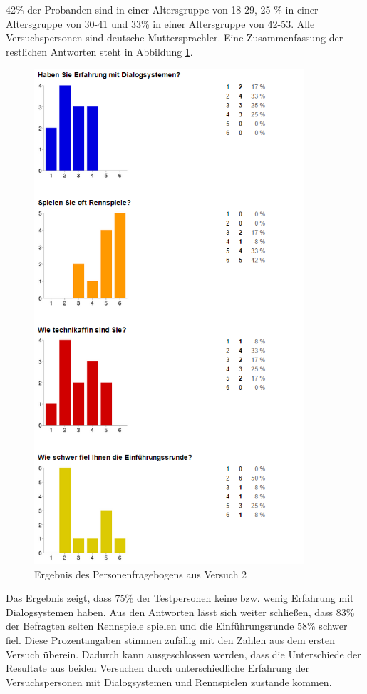\documentclass[12pt,a4paper]{scrartcl}
\begin{document}
42\% der Probanden sind in einer Altersgruppe von 18-29, 25 \% in einer Altersgruppe von 30-41 und 33\% in einer Altersgruppe von 42-53. Alle Versuchspersonen sind deutsche Muttersprachler. 
Eine Zusammenfassung der restlichen Antworten steht in Abbildung \ref{fbpersonaus2}.


\begin{figure}[H]
\begin{center}
\includegraphics[width=10cm]{person2.png}
\caption{Ergebnis des Personenfragebogens aus Versuch 2}
\label{fbpersonaus2}
\end{center}
\end{figure}
\newpage

Das Ergebnis zeigt, dass 75\% der Testpersonen keine bzw. wenig Erfahrung mit Dialogsystemen haben. Aus den Antworten lässt sich weiter schließen, dass 83\% der Befragten selten Rennspiele spielen und die Einführungsrunde 58\% schwer fiel. Diese Prozentangaben stimmen zufällig mit den Zahlen aus dem ersten Versuch überein. Dadurch kann ausgeschlossen werden, dass die Unterschiede der Resultate aus beiden Versuchen durch unterschiedliche Erfahrung der Versuchspersonen mit Dialogsystemen und Rennspielen zustande kommen. 
\end{document}
